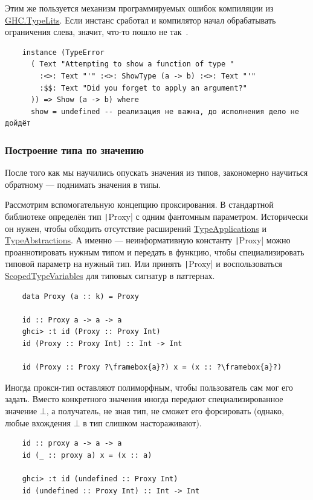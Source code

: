 Этим же пользуется механизм программируемых ошибок компиляции из \href{https://hackage.haskell.org/package/base-4.20.0.1/docs/GHC-TypeLits.html}{GHC.TypeLits}.
Если инстанс сработал и компилятор начал обрабатывать ограничения слева, значит, что-то пошло не так~\cite[глава 12]{maguire-types}.

\begin{verbatim}
    instance (TypeError
      ( Text "Attempting to show a function of type "
        :<>: Text "'" :<>: ShowType (a -> b) :<>: Text "'"
        :$$: Text "Did you forget to apply an argument?"
      )) => Show (a -> b) where
      show = undefined -- реализация не важна, до исполнения дело не дойдёт
\end{verbatim}

\subsubsection{Построение типа по значению}

После того как мы научились опускать значения из типов, закономерно научиться обратному --- поднимать значения в типы.

Рассмотрим вспомогательную концепцию проксирования.
В стандартной библиотеке определён тип \texttt|Proxy| с одним фантомным параметром.
Исторически он нужен, чтобы обходить отсутствие расширений \href{https://downloads.haskell.org/ghc/latest/docs/users_guide/exts/type_applications.html#extension-TypeApplications}{TypeApplications} и \href{https://downloads.haskell.org/ghc/latest/docs/users_guide/exts/type_abstractions.html#extension-TypeAbstractions}{TypeAbstractions}.
А именно --- неинформативную константу \texttt|Proxy| можно проаннотировать нужным типом и передать в функцию, чтобы специализировать типовой параметр на нужный тип.
Или принять \texttt|Proxy| и воспользоваться \href{https://downloads.haskell.org/ghc/latest/docs/users_guide/exts/scoped_type_variables.html#pattern-type-signatures}{ScopedTypeVariables} для типовых сигнатур в паттернах.
\begin{verbatim}
    data Proxy (a :: k) = Proxy

    id :: Proxy a -> a -> a
    ghci> :t id (Proxy :: Proxy Int)
    id (Proxy :: Proxy Int) :: Int -> Int

    id (Proxy :: Proxy ?\framebox{a}?) x = (x :: ?\framebox{a}?)
\end{verbatim}

Иногда прокси-тип оставляют полиморфным, чтобы пользователь сам мог его задать.
Вместо конкретного значения иногда передают специализированное значение $\bot$, а получатель, не зная тип, не сможет его форсировать (однако, любые вхождения $\bot$ в тип слишком настораживают).
\begin{verbatim}
    id :: proxy a -> a -> a
    id (_ :: proxy a) x = (x :: a)

    ghci> :t id (undefined :: Proxy Int)
    id (undefined :: Proxy Int) :: Int -> Int
\end{verbatim}

